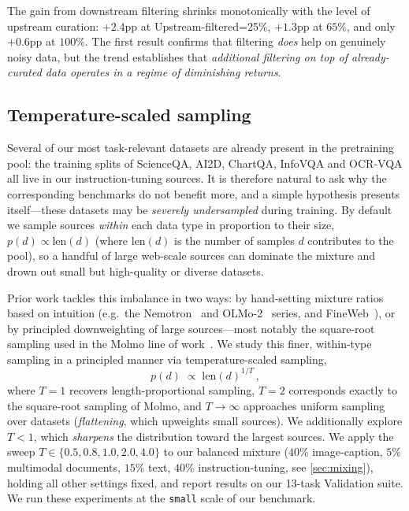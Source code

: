 The gain from downstream filtering shrinks monotonically with the level of upstream curation: $+2.4$pp at Upstream-filtered=25\%, $+1.3$pp at $65$\%, and only $+0.6$pp at $100$\%. The first result confirms that filtering \emph{does} help on genuinely noisy data, but the trend establishes that \textit{additional filtering on top of already-curated data operates in a regime of diminishing returns}.

\subsection{Temperature-scaled sampling}\label{appsub:temperature}

Several of our most task-relevant datasets are already present in the pretraining pool: the training splits of ScienceQA, AI2D, ChartQA, InfoVQA and OCR-VQA all live in our instruction-tuning sources.
It is therefore natural to ask why the corresponding benchmarks do not benefit more, and a simple hypothesis presents itself---these datasets may be \emph{severely undersampled} during training.
By default we sample sources \emph{within} each data type in proportion to their size, $p(d) \propto \mathrm{len}(d)$ (where $\mathrm{len}(d)$ is the number of samples $d$ contributes to the pool), so a handful of large web-scale sources can dominate the mixture and drown out small but high-quality or diverse datasets.

Prior work tackles this imbalance in two ways: by hand-setting mixture ratios based on intuition (e.g.\ the Nemotron~\citep{diao2025nemotron} and OLMo-2~\citep{olmo20242} series, and FineWeb~\citep{penedo2024fineweb}), or by principled downweighting of large sources---most notably the square-root sampling used in the Molmo line of work~\citep{deitke2025molmo,clark2026molmo2}.
We study this finer, within-type sampling in a principled manner via temperature-scaled sampling,
\begin{equation}
    p(d) \;\propto\; \mathrm{len}(d)^{1/T}\,,
\end{equation}
where $T=1$ recovers length-proportional sampling, $T=2$ corresponds exactly to the square-root sampling of Molmo, and $T\rightarrow\infty$ approaches uniform sampling over datasets (\emph{flattening}, which upweights small sources). We additionally explore $T<1$, which \emph{sharpens} the distribution toward the largest sources.
We apply the sweep $T \in \{0.5, 0.8, 1.0, 2.0, 4.0\}$ to our balanced mixture ($40$\% image-caption, $5$\% multimodal documents, $15$\% text, $40$\% instruction-tuning, see \cref{sec:mixing}), holding all other settings fixed, and report results on our 13-task Validation suite. We run these experiments at the \texttt{small} scale of our benchmark.

